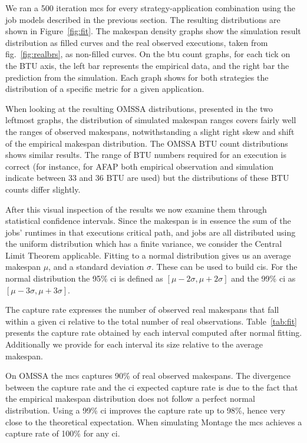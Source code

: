 \documentclass[10pt,conference,compsocconf]{IEEEtran}
\begin{document}
We ran a 500 iteration \ac{mcs} for every strategy-application combination using
the job  models described in  the previous section. The  resulting distributions
are  shown  in  Figure~\ref{fig:fit}.   The makespan  density  graphs  show  the
simulation  result  distribution   as  filled  curves  and   the  real  observed
executions,  taken from  fig.~\ref{fig:realbrs}, as  non-filled curves.   On the
\ac{btu} count graphs,  for each tick on  the BTU axis, the  left bar represents
the empirical data, and the right  bar the prediction from the simulation.  Each
graph shows  for both  strategies the  distribution of a  specific metric  for a
given application.

When looking at the resulting OMSSA distributions, presented in the two leftmost
graphs,  the distribution  of simulated  makespan ranges  covers fairly  well the
ranges of  observed makespans, notwithstanding a  slight right skew and  shift of
the empirical  makespan distribution.  The  OMSSA BTU count  distributions shows
similar results.  The range of BTU  numbers required for an execution is correct
(for  instance, for  AFAP  both empirical  observation  and simulation  indicate
between  33 and  36 BTU  are used)  but the  distributions of  these BTU  counts
differ slightly.


After  this  visual inspection  of  the  results  we  now examine  them  through
statistical confidence intervals.   Since the makespan is in essence  the sum of
the jobs' runtimes  in that  executions critical path,  and jobs  are all
distributed  using the  uniform distribution  which  has a  finite variance,  we
consider the Central Limit Theorem applicable.  Fitting to a normal distribution
gives us an average makespan $\mu{}$, and a standard deviation $\sigma{}$. These
can be used to  build \acp{ci}. For the normal distribution  the 95\% \ac{ci} is
defined  as   $[\mu{}-2\sigma{},\mu{}+2\sigma{}]$  and   the  99\%   \ac{ci}  as
$[\mu{}-3\sigma{},\mu{}+3\sigma{}]$.

The capture rate expresses the number of observed real makespans that fall
within a given \ac{ci} relative to the total number of real observations.
Table~\ref{tab:fit} presents the capture rate obtained by each interval computed
after normal fitting.  Additionally we provide for each interval its size
relative to the average makespan.

On OMSSA the  \ac{mcs} captures 90\% of real observed  makespans. The divergence
between the  capture rate and  the \ac{ci} expected capture  rate is due  to the
fact that the  empirical makespan distribution does not follow  a perfect normal
distribution. Using  a 99\% \ac{ci}  improves the capture  rate up to  98\%,
hence very close  to the theoretical expectation.   When simulating Montage  the
\ac{mcs} achieves a capture rate of 100\% for any \ac{ci}.
\end{document}

